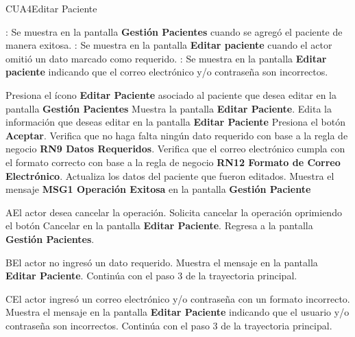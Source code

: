 \begin{UseCase}{CUA4}{Editar Paciente}
{\begin{UClist}
	    \UCli {}: Se muestra en la pantalla \textbf{Gestión Pacientes} cuando se agregó el paciente de manera exitosa.
	    \UCli {}: Se muestra en la pantalla \textbf{Editar paciente} cuando el actor omitió un dato marcado como requerido.
	    \UCli {}: Se muestra en la pantalla \textbf{Editar paciente} indicando que el correo electrónico y/o contraseña son incorrectos.
		
	    \end{UClist}
	}
 \end{UseCase}

 \begin{UCtrayectoria}
 	
 	\UCpaso [\UCactor] Presiona el ícono \textbf{Editar Paciente} asociado al paciente que desea editar en la pantalla \textbf{Gestión Pacientes}
 	\UCpaso Muestra la pantalla \textbf{Editar Paciente}.
 	\UCpaso [\UCactor] Edita la información que deseas editar en la pantalla \textbf{Editar Paciente}
 	\UCpaso [\UCactor] Presiona el botón \textbf{Aceptar}.
 	\UCpaso Verifica que no haga falta ningún dato requerido con base a la regla de negocio \textbf{RN9 Datos Requeridos}.
 	\UCpaso Verifica que el correo electrónico cumpla con el formato correcto con base a la regla de negocio \textbf{RN12 Formato de Correo Electrónico}.
 	\UCpaso Actualiza los datos del paciente que fueron editados.
 	\UCpaso Muestra el mensaje \textbf{MSG1 Operación Exitosa} en la pantalla \textbf{Gestión Paciente}
 	   
 \end{UCtrayectoria}

 \begin{UCtrayectoriaA}{A}{El actor desea cancelar la operación.}
	\UCpaso[\UCactor] Solicita cancelar la operación oprimiendo el botón Cancelar en la pantalla \textbf{Editar Paciente}.
	\UCpaso Regresa a la pantalla \textbf{Gestión Pacientes}.
\end{UCtrayectoriaA}

\begin{UCtrayectoriaA}{B}{El actor no ingresó un dato requerido.}
	\UCpaso Muestra el mensaje  en la pantalla \textbf{Editar Paciente}.
	\UCpaso Continúa con el paso 3 de la trayectoria principal.
\end{UCtrayectoriaA}

\begin{UCtrayectoriaA}{C}{El actor ingresó un correo electrónico y/o contraseña con un formato incorrecto.}
	\UCpaso Muestra el mensaje  en la pantalla \textbf{Editar Paciente} indicando que el usuario y/o contraseña son incorrectos.
	\UCpaso Continúa con el paso 3 de la trayectoria principal.
\end{UCtrayectoriaA} 
